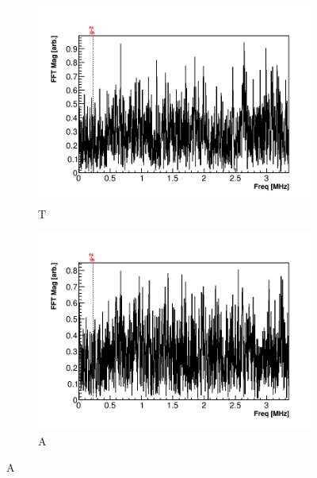 \begin{figure}[]
\centering
    \begin{subfigure}[t]{0.45\textwidth}
        \centering
        \includegraphics[width=\textwidth]{FFT_TMethod}
        \caption{T}
    \end{subfigure}
    \hspace{1mm}
    \begin{subfigure}[t]{0.45\textwidth}
        \centering
        \includegraphics[width=\textwidth]{FFT_AMethod}
        \caption{A}
    \end{subfigure}%


\end{figure}
